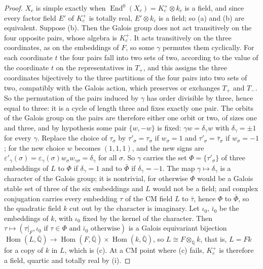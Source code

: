 \documentclass[11pt,reqno]{amsart}
\theoremstyle{plain}
\theoremstyle{definition}
\theoremstyle{remark}
\newcommand{\QQ}{\mathbb{Q}}
\DeclareMathOperator{\End}{End}
\begin{document}
\begin{proof}
$X_{c}$ is simple exactly when $\End^{0}(X_{c})=K_{c}^{+}\otimes k_{c}$ is a
field, and since every factor field $E'$ of $K_{c}^{+}$ is totally real,
$E'\otimes k_{c}$ is a field; so (a) and (b) are equivalent. Suppose (b).
Then the Galois group does not act transitively on the four opposite pairs,
whose algebra is $K_{c}^{+}$. It acts transitively on the three
coordinates, as on the embeddings of $F$, so some $\gamma$ permutes them
cyclically. For each coordinate $t$ the four pairs fall into two sets of
two, according to the value of the coordinate $t$ on the representatives in
$T_{+}$, and this assigns the three coordinates bijectively to the three
partitions of the four pairs into two sets of two, compatibly with the
Galois action, which preserves or exchanges $T_{+}$ and $T_{-}$. So the
permutation of the pairs induced by $\gamma$ has order divisible by three,
hence equal to three: it is a cycle of length three and fixes exactly one
pair. The orbits of the Galois group on the pairs are therefore either one
orbit or two, of sizes one and three, and by hypothesis some pair
$\{w,-w\}$ is fixed: $\gamma w=\delta_{\gamma}w$ with
$\delta_{\gamma}=\pm1$ for every $\gamma$. Replace the choice of
$\tau_{\sigma}$ by $\tau'_{\sigma}=\tau_{\sigma}$ if $w_{\sigma}=1$ and
$\tau'_{\sigma}=\bar{\tau}_{\sigma}$ if $w_{\sigma}=-1$; for the new choice
$w$ becomes $(1,1,1)$, and the new signs are
$\varepsilon'_{\gamma}(\sigma)=\varepsilon_{\gamma}(\sigma)w_{\sigma}
w_{\gamma\sigma}=\delta_{\gamma}$ for all $\sigma$. So $\gamma$ carries the
set $\Phi=\{\tau'_{\sigma}\}$ of three embeddings of $L$ to $\Phi$ if
$\delta_{\gamma}=1$ and to $\bar{\Phi}$ if $\delta_{\gamma}=-1$. The map
$\gamma\mapsto\delta_{\gamma}$ is a character of the Galois group; it is
nontrivial, for otherwise $\Phi$ would be a Galois stable set of three of the
six embeddings and $L$ would not be a field; and complex conjugation carries
every embedding $\tau$ of the CM field $L$ to $\bar{\tau}$, hence $\Phi$ to
$\bar{\Phi}$, so the quadratic field $k$ cut out by the character is
imaginary. Let $\iota_{0}$, $\bar{\iota}_{0}$ be the embeddings of $k$, with
$\iota_{0}$ fixed by the kernel of the character. Then $\tau\mapsto(\tau|_{F},
\iota_{0}\text{ if }\tau\in\Phi\text{ and }\bar{\iota}_{0}\text{ otherwise})$
is a Galois equivariant bijection $\operatorname{Hom}(L,\bar{\QQ})\to
\operatorname{Hom}(F,\bar{\QQ})\times\operatorname{Hom}(k,\bar{\QQ})$, so
$L\cong F\otimes_{\QQ}k$, that is, $L=Fk$ for a copy of $k$ in $L$, which is
(c). At a CM point where (c) fails, $K_{c}^{+}$ is therefore a field, quartic
and totally real by (i).


\end{proof}
\end{document}
